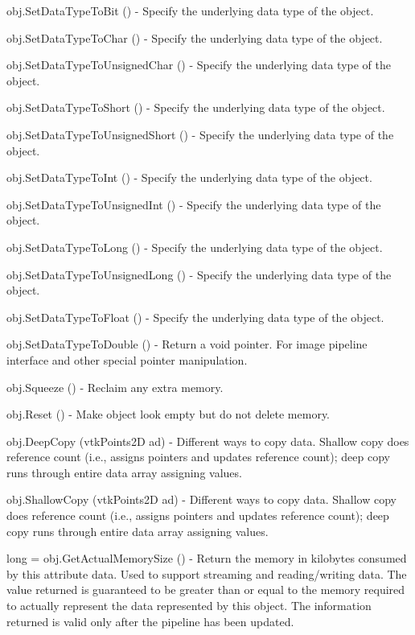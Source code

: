 \begin{DoxyItemize}
\item {\ttfamily obj.\-Set\-Data\-Type\-To\-Bit ()} -\/ Specify the underlying data type of the object.  
\item {\ttfamily obj.\-Set\-Data\-Type\-To\-Char ()} -\/ Specify the underlying data type of the object.  
\item {\ttfamily obj.\-Set\-Data\-Type\-To\-Unsigned\-Char ()} -\/ Specify the underlying data type of the object.  
\item {\ttfamily obj.\-Set\-Data\-Type\-To\-Short ()} -\/ Specify the underlying data type of the object.  
\item {\ttfamily obj.\-Set\-Data\-Type\-To\-Unsigned\-Short ()} -\/ Specify the underlying data type of the object.  
\item {\ttfamily obj.\-Set\-Data\-Type\-To\-Int ()} -\/ Specify the underlying data type of the object.  
\item {\ttfamily obj.\-Set\-Data\-Type\-To\-Unsigned\-Int ()} -\/ Specify the underlying data type of the object.  
\item {\ttfamily obj.\-Set\-Data\-Type\-To\-Long ()} -\/ Specify the underlying data type of the object.  
\item {\ttfamily obj.\-Set\-Data\-Type\-To\-Unsigned\-Long ()} -\/ Specify the underlying data type of the object.  
\item {\ttfamily obj.\-Set\-Data\-Type\-To\-Float ()} -\/ Specify the underlying data type of the object.  
\item {\ttfamily obj.\-Set\-Data\-Type\-To\-Double ()} -\/ Return a void pointer. For image pipeline interface and other special pointer manipulation.  
\item {\ttfamily obj.\-Squeeze ()} -\/ Reclaim any extra memory.  
\item {\ttfamily obj.\-Reset ()} -\/ Make object look empty but do not delete memory.  
\item {\ttfamily obj.\-Deep\-Copy (vtk\-Points2\-D ad)} -\/ Different ways to copy data. Shallow copy does reference count (i.\-e., assigns pointers and updates reference count); deep copy runs through entire data array assigning values.  
\item {\ttfamily obj.\-Shallow\-Copy (vtk\-Points2\-D ad)} -\/ Different ways to copy data. Shallow copy does reference count (i.\-e., assigns pointers and updates reference count); deep copy runs through entire data array assigning values.  
\item {\ttfamily long = obj.\-Get\-Actual\-Memory\-Size ()} -\/ Return the memory in kilobytes consumed by this attribute data. Used to support streaming and reading/writing data. The value returned is guaranteed to be greater than or equal to the memory required to actually represent the data represented by this object. The information returned is valid only after the pipeline has been updated.  

\end{DoxyItemize}

